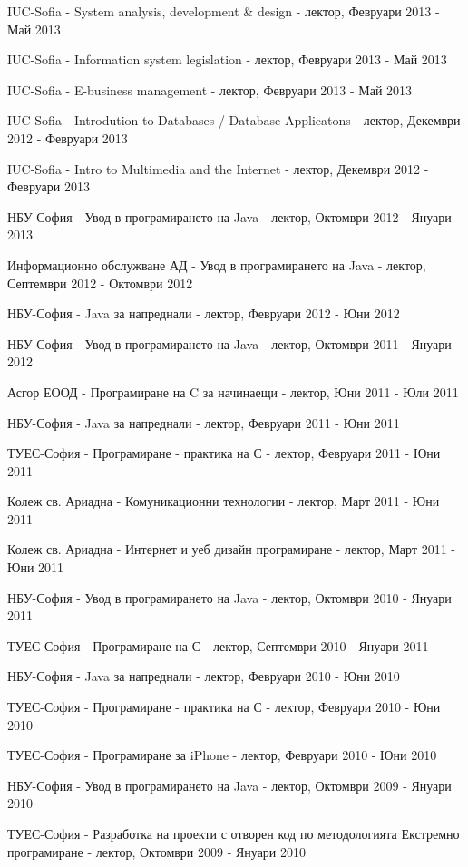 \documentclass[bulgarian,a4paper]{europasscv}
\begin{document}
\begin{europasscv}
{\begin{ecvitemize}
    \item IUC-Sofia - System analysis, development \& design - лектор, Февруари 2013 - Май 2013
    \item IUC-Sofia - Information system legislation - лектор, Февруари 2013 - Май 2013
    \item IUC-Sofia - E-business management - лектор, Февруари 2013 - Май 2013
    \item IUC-Sofia - Introdution to Databases / Database Applicatons - лектор, Декември 2012 - Февруари 2013
    \item IUC-Sofia - Intro to Multimedia and the Internet - лектор, Декември 2012 - Февруари 2013
    \item НБУ-София - Увод в програмирането на Java - лектор, Октомври 2012 - Януари 2013
    \item Информационно обслужване АД - Увод в програмирането на Java - лектор, Септември 2012 - Октомври 2012
    \item НБУ-София - Java за напреднали - лектор, Февруари 2012 - Юни 2012
    \item НБУ-София - Увод в програмирането на Java - лектор, Октомври 2011 - Януари 2012
    \item Асгор ЕООД - Програмиране на C за начинаещи - лектор, Юни 2011 - Юли 2011
    \item НБУ-София - Java за напреднали - лектор, Февруари 2011 - Юни 2011
    \item ТУЕС-София - Програмиране - практика на С - лектор, Февруари 2011 - Юни 2011
    \item Колеж св. Ариадна - Комуникационни технологии - лектор, Март 2011 - Юни 2011
    \item Колеж св. Ариадна - Интернет и уеб дизайн програмиране - лектор, Март 2011 - Юни 2011
    \item НБУ-София - Увод в програмирането на Java - лектор, Октомври 2010 - Януари 2011
    \item ТУЕС-София - Програмиране на С - лектор, Септември 2010 - Януари 2011
    \item НБУ-София - Java за напреднали - лектор, Февруари 2010 - Юни 2010
    \item ТУЕС-София - Програмиране - практика на С - лектор, Февруари 2010 - Юни 2010
    \item ТУЕС-София - Програмиране за iPhone - лектор, Февруари 2010 - Юни 2010
    \item НБУ-София - Увод в програмирането на Java - лектор, Октомври 2009 - Януари 2010
    \item ТУЕС-София - Разработка на проекти с отворен код по методологията Екстремно програмиране - лектор, Октомври 2009 - Януари 2010

\end{ecvitemize}}
\end{europasscv}
\end{document}
